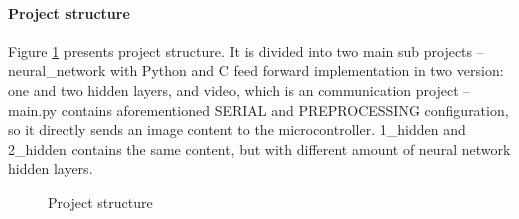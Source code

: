 \paragraph{Project structure}
Figure \ref{fig:project structure} presents project structure. It is divided into two main sub projects -- neural\_network with Python and C feed forward implementation in two version: one and two hidden layers, and video, which is an communication project -- main.py contains aforementioned SERIAL and PREPROCESSING configuration, so it directly sends an image content to the microcontroller. 1\_hidden and 2\_hidden contains the same content, but with different amount of neural network hidden layers. 
\begin{figure}[H]
	\begin{center}
	\end{center}
	\caption{Project structure}

	\label{fig:project structure}
\end{figure}

